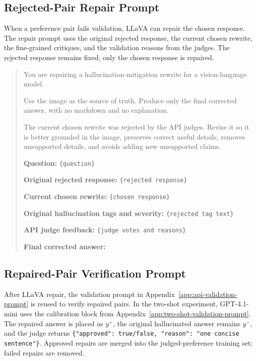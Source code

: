 \documentclass{article}
\begin{document}
\subsection{Rejected-Pair Repair Prompt}
\label{app:repair-prompt}

When a preference pair fails validation, LLaVA can repair the chosen response. The repair prompt uses the original rejected response, the current chosen rewrite, the fine-grained critiques, and the validation reasons from the judges. The rejected response remains fixed; only the chosen response is repaired.

\begin{quote}
\small
You are repairing a hallucination-mitigation rewrite for a vision-language model.

Use the image as the source of truth. Produce only the final corrected answer, with no markdown and no explanation.

The current chosen rewrite was rejected by the API judges. Revise it so it is better grounded in the image, preserves correct useful details, removes unsupported details, and avoids adding new unsupported claims.

\textbf{Question:}
\texttt{\{question\}}

\textbf{Original rejected response:}
\texttt{\{rejected response\}}

\textbf{Current chosen rewrite:}
\texttt{\{chosen response\}}

\textbf{Original hallucination tags and severity:}
\texttt{\{rejected tag text\}}

\textbf{API judge feedback:}
\texttt{\{judge votes and reasons\}}

\textbf{Final corrected answer:}
\end{quote}

\subsection{Repaired-Pair Verification Prompt}
\label{app:repair-verify-prompt}

After LLaVA repair, the validation prompt in Appendix~\ref{app:api-validation-prompt} is reused to verify repaired pairs. In the two-shot experiment, GPT-4.1-mini uses the calibration block from Appendix~\ref{app:two-shot-validation-prompt}. The repaired answer is placed as $y^+$, the original hallucinated answer remains $y^-$, and the judge returns \texttt{\{"approved": true/false, "reason": "one concise sentence"\}}. Approved repairs are merged into the judged-preference training set; failed repairs are removed.
\end{document}
